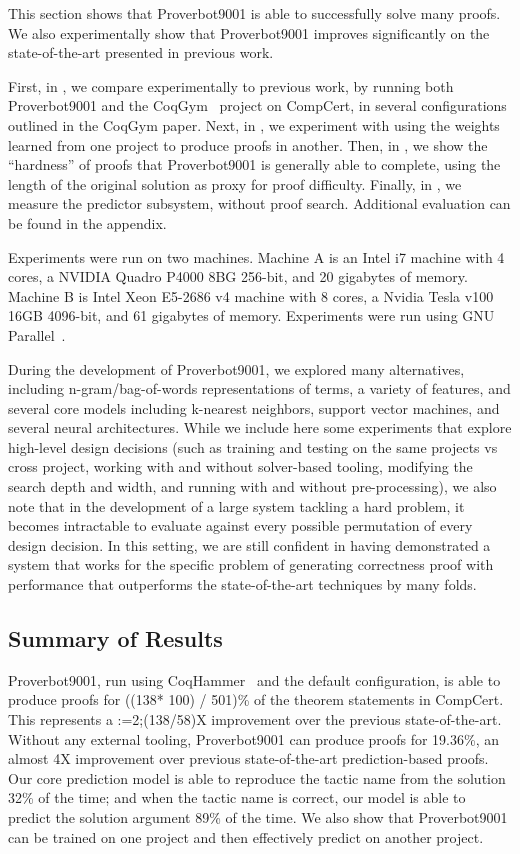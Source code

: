 \documentclass[sigplan,screen]{acmart}
\newcommand{\name}{Proverbot9001\xspace}
\newcommand{\PH}{138}
\newcommand{\PHPercent}{\number\numexpr((\PH * 100) / 501)\relax\%\xspace}
\renewcommand{\>}{\quad}
\begin{document}
This section shows that \name{} is able to successfully solve many proofs.
We also experimentally show that \name{} improves significantly
  on the state-of-the-art presented in previous work.

First, in , we compare experimentally to previous work,
  by running both \name{} and the CoqGym~\cite{coqgym} project on CompCert,
  in several configurations outlined in the CoqGym paper.
Next, in ,
  we experiment with using the weights learned from one project
  to produce proofs in another.
Then, in ,
  we show the ``hardness'' of proofs that Proverbot9001 is generally able to complete,
  using the length of the original solution as proxy for proof difficulty.
Finally, in , we measure the predictor subsystem, without proof search.
Additional evaluation can be found in the appendix.


Experiments were run on two machines.
Machine A is an Intel i7 machine with 4 cores,
  a NVIDIA Quadro P4000 8BG 256-bit,
  and 20 gigabytes of memory.
Machine B is Intel Xeon E5-2686 v4 machine with 8 cores,
  a Nvidia Tesla v100 16GB 4096-bit,
  and 61 gigabytes of memory.
Experiments were run using GNU Parallel~\cite{gnu-parallel}.

During the development of \name{}, we explored many alternatives,
including n-gram/bag-of-words representations of terms, a variety of features,
and several core models including k-nearest neighbors, support vector machines,
and several neural architectures. While we include here some experiments that
explore high-level design decisions (such as training and testing on the same
projects vs cross project, working with and without solver-based tooling,
modifying the search depth and width, and running with and without
pre-processing), we also note that in the development of a large system tackling
a hard problem, it becomes intractable to evaluate against every possible
permutation of every design decision. In this setting, we are still confident in
having demonstrated a system that works for the specific problem of generating
correctness proof with performance that outperforms the state-of-the-art
techniques by many folds.


\subsection{Summary of Results}

\name{}, run using CoqHammer~\cite{coqhammer} and the default configuration,
  is able to produce proofs for \PHPercent of
  the theorem statements in CompCert.
This represents a \xintDigits:=2;\xintthefloatexpr(\PH/58)\relax X improvement
  over the previous state-of-the-art.
Without any external tooling, \name{} can produce proofs for 19.36\%,
  an almost 4X improvement over previous state-of-the-art prediction-based proofs.
Our core prediction model is able to reproduce the tactic name from the solution
  32\% of the time;
  and when the tactic name is correct,
  our model is able to predict the solution argument 89\% of the time.
We also show that Proverbot9001 can be trained on one project
  and then effectively predict on another project.
\end{document}
